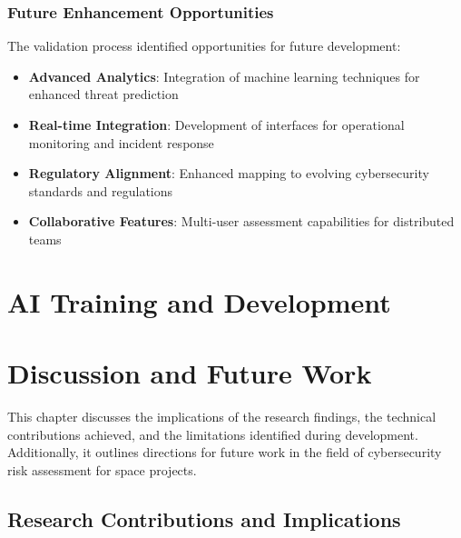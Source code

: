 \documentclass[binding=0.6cm]{sapthesis}
\begin{document}
\subsection{Future Enhancement Opportunities}

The validation process identified opportunities for future development:

\begin{itemize}
    \item \textbf{Advanced Analytics}: Integration of machine learning techniques for enhanced threat prediction
    \item \textbf{Real-time Integration}: Development of interfaces for operational monitoring and incident response
    \item \textbf{Regulatory Alignment}: Enhanced mapping to evolving cybersecurity standards and regulations
    \item \textbf{Collaborative Features}: Multi-user assessment capabilities for distributed teams
\end{itemize}

\chapter{AI Training and Development}
\label{ch:ai_training}


\chapter{Discussion and Future Work}
\label{ch:discussion}

This chapter discusses the implications of the research findings, the technical contributions achieved, and the limitations identified during development. Additionally, it outlines directions for future work in the field of cybersecurity risk assessment for space projects.

\section{Research Contributions and Implications}
\end{document}

